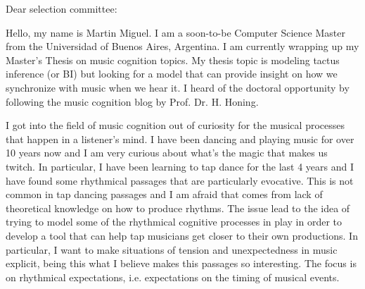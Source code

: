 \documentclass[a4paper]{letter}
\begin{document}
\begin{letter}{}

\opening{Dear selection committee:}

Hello, my name is Martin Miguel. I am a soon-to-be Computer Science Master from
the Universidad of Buenos Aires, Argentina. I am currently wrapping up my
Master's Thesis on music cognition topics. My thesis topic is modeling tactus
inference (or BI) but looking for a model that can provide insight on how we
synchronize with music when we hear it. I heard of the doctoral opportunity by
following the music cognition blog by Prof. Dr. H. Honing.

I got into the field of music cognition out of curiosity for the musical
processes that happen in a listener's mind. I have been dancing and playing
music for over 10 years now and I am very curious about what's the magic that
makes us twitch. In particular, I have been learning to tap dance for the last
4 years and I have found some rhythmical passages that are particularly
evocative. This is not common in tap dancing passages and I am afraid that
comes from lack of theoretical knowledge on how to produce rhythms. The issue
lead to the idea of trying to model some of the rhythmical cognitive processes
in play in order to develop a tool that can help tap musicians get closer to
their own productions. In particular, I want to make situations of tension and
unexpectedness in music explicit, being this what I believe makes this passages
so interesting. The focus is on rhythmical expectations, i.e. expectations on
the timing of musical events.



\end{letter}
\end{document}
